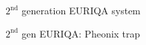 \documentclass{beamer}
\begin{document}


\begin{frame}{$2^{\text{nd}}$ generation EURIQA system}
  \begin{center}
    \begin{tikzpicture}
    \end{tikzpicture}
  \end{center}
\end{frame}





\begin{frame}{$2^{\text{nd}}$ gen EURIQA: Pheonix trap}
  \begin{center}
    \begin{tikzpicture}
    \end{tikzpicture}
  \end{center}
\end{frame}
\end{document}

